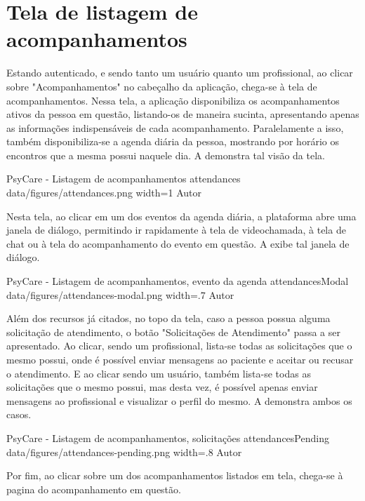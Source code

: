 \section{Tela de listagem de acompanhamentos}
\label{sec:acompanhamentos}

Estando autenticado, e sendo tanto um usuário quanto um profissional, ao clicar sobre "Acompanhamentos" no cabeçalho da aplicação, chega-se à tela de acompanhamentos. Nessa tela, a aplicação disponibiliza os acompanhamentos ativos da pessoa em questão, listando-os de maneira sucinta, apresentando apenas as informações indispensáveis de cada acompanhamento. Paralelamente a isso, também disponibiliza-se a agenda diária da pessoa, mostrando por horário os encontros que a mesma possui naquele dia. A  demonstra tal visão da tela.

\image
    {PsyCare - Listagem de acompanhamentos}
    {attendances}
    {data/figures/attendances.png}
    {width=1\textwidth}
    {Autor}

Nesta tela, ao clicar em um dos eventos da agenda diária, a plataforma abre uma janela de diálogo, permitindo ir rapidamente à tela de videochamada, à tela de chat ou à tela do acompanhamento do evento em questão. A  exibe tal janela de diálogo.

\image
    {PsyCare - Listagem de acompanhamentos, evento da agenda}
    {attendancesModal}
    {data/figures/attendances-modal.png}
    {width=.7\textwidth}
    {Autor}

Além dos recursos já citados, no topo da tela, caso a pessoa possua alguma solicitação de atendimento, o botão "Solicitações de Atendimento" passa a ser apresentado. Ao clicar, sendo um profissional, lista-se todas as solicitações que o mesmo possui, onde é possível enviar mensagens ao paciente e aceitar ou recusar o atendimento. E ao clicar sendo um usuário, também lista-se todas as solicitações que o mesmo possui, mas desta vez, é possível apenas enviar mensagens ao profissional e visualizar o perfil do mesmo. A  demonstra ambos os casos.

\image
    {PsyCare - Listagem de acompanhamentos, solicitações}
    {attendancesPending}
    {data/figures/attendances-pending.png}
    {width=.8\textwidth}
    {Autor}

Por fim, ao clicar sobre um dos acompanhamentos listados em tela, chega-se à pagina do acompanhamento em questão.